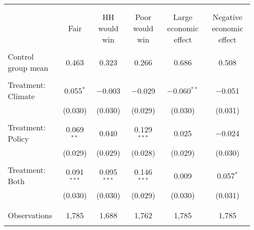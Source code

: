 
\begin{tabular}{@{\extracolsep{5pt}}lccccc} 
\\[-1.8ex]\hline 
\hline \\[-1.8ex] 
\\[-1.8ex] & Fair & HH would win & Poor would win & Large economic effect & Negative economic effect \\ 
\hline \\[-1.8ex] 
 Control group mean & 0.463 & 0.323 & 0.266 & 0.686 & 0.508  \\ \hline \\[-1.8ex] Treatment: Climate & 0.055$^{*}$ & $-$0.003 & $-$0.029 & $-$0.060$^{**}$ & $-$0.051 \\ 
  & (0.030) & (0.030) & (0.029) & (0.030) & (0.031) \\ 
  & & & & & \\ 
 Treatment: Policy & 0.069$^{**}$ & 0.040 & 0.129$^{***}$ & 0.025 & $-$0.024 \\ 
  & (0.029) & (0.029) & (0.028) & (0.029) & (0.030) \\ 
  & & & & & \\ 
 Treatment: Both & 0.091$^{***}$ & 0.095$^{***}$ & 0.146$^{***}$ & 0.009 & 0.057$^{*}$ \\ 
  & (0.030) & (0.030) & (0.029) & (0.030) & (0.031) \\ 
  & & & & & \\ 
\hline \\[-1.8ex] 

Observations & 1,785 & 1,688 & 1,762 & 1,785 & 1,785 \\ 
\hline 
\hline \\[-1.8ex] 
\end{tabular} 